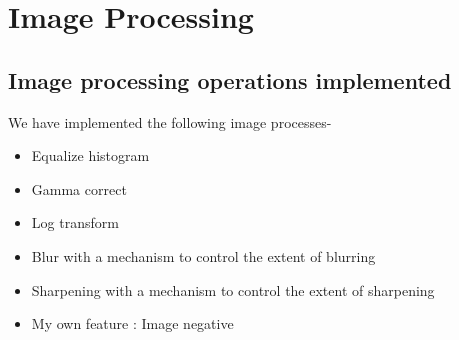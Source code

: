 \documentclass[conference]{IEEEtran}
\begin{document}
{{%


\section{Image Processing}


\subsection{Image processing operations implemented}\label{AA}
We have implemented the following image processes- 
\begin{itemize}
    \item Equalize histogram
    \item Gamma correct
    \item Log transform
    \item  Blur with a mechanism to control the extent of blurring 
    \item Sharpening with a mechanism to control the extent of sharpening
    \item My own feature : Image negative
\end{itemize}
}}
\end{document}
